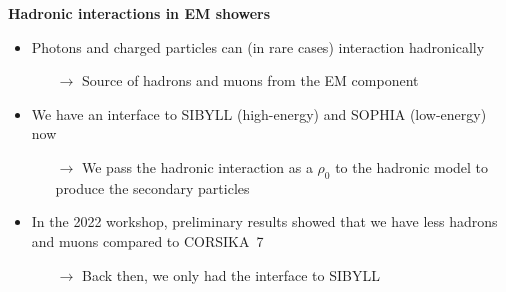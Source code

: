 \documentclass[aspectratio=1610, 9pt]{beamer}
\begin{document}
\begin{frame}
\textbf{Hadronic interactions in EM showers}

    \begin{itemize}
      \item Photons and charged particles can (in rare cases) interaction hadronically
      \begin{itemize}
        \item[$\rightarrow$] Source of hadrons and muons from the EM component
      \end{itemize}
      \item We have an interface to SIBYLL (high-energy) and SOPHIA (low-energy) now
      \begin{itemize}
        \item[$\rightarrow$] We pass the hadronic interaction as a $\rho_0$ to the hadronic model to produce the secondary particles
      \end{itemize}
      \item In the 2022 workshop, preliminary results showed that we have less hadrons and muons compared to CORSIKA~7
      \begin{itemize}
        \item[$\rightarrow$] Back then, we only had the interface to SIBYLL
      \end{itemize}
    \end{itemize}

\end{frame}
\end{document}
